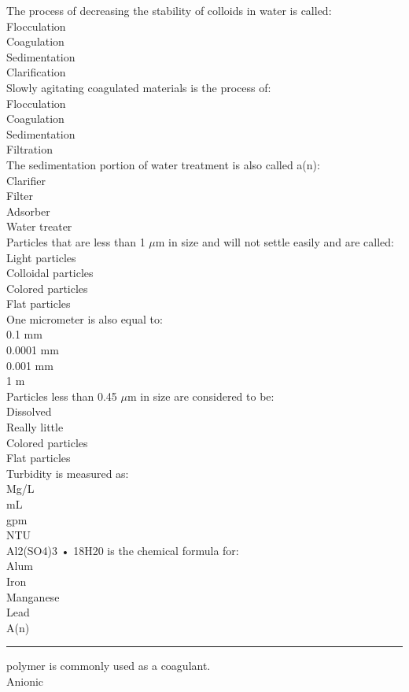 The process of decreasing the stability of colloids in water is called:\\
Flocculation\\
Coagulation\\
Sedimentation\\
Clarification\\
Slowly agitating coagulated materials is the process of:\\
Flocculation\\
Coagulation\\
Sedimentation\\
Filtration\\
The sedimentation portion of water treatment is also called a(n):\\
Clarifier\\
Filter\\
Adsorber\\
Water treater\\
Particles that are less than 1 $\mu\text{m}$ in size and will not settle easily and are called:\\
Light particles\\
Colloidal particles\\
Colored particles\\
Flat particles\\
One micrometer is also equal to:\\
0.1 mm\\
0.0001 mm\\
0.001 mm\\
1 m\\
Particles less than 0.45 $\mu\text{m}$ in size are considered to be:\\
Dissolved\\
Really little\\
Colored particles\\
Flat particles\\
Turbidity is measured as:\\
Mg/L\\
mL\\
gpm\\
NTU\\
Al2(SO4)3 • 18H20 is the chemical formula for:\\
Alum\\
Iron\\
Manganese\\
Lead\\
A(n) \rule{1cm}{0.5pt}  polymer is commonly used as a coagulant.\\
Anionic\\
